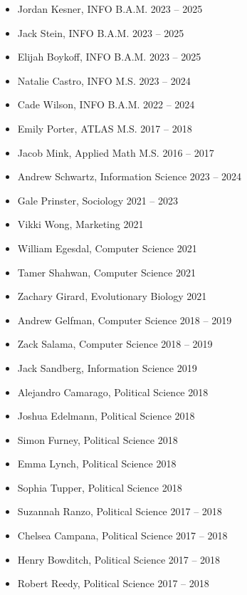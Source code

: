 \documentclass{cv}
\begin{document}
	\begin{itemize}
		\item Jordan Kesner, INFO B.A.M. \hfill 2023 -- 2025
		\item Jack Stein, INFO B.A.M. \hfill 2023 -- 2025
		\item Elijah Boykoff, INFO B.A.M. \hfill 2023 -- 2025
		\item Natalie Castro, INFO M.S. \hfill 2023 -- 2024
		\item Cade Wilson, INFO B.A.M. \hfill 2022 -- 2024
		\item Emily Porter, ATLAS M.S. \hfill 2017 -- 2018
		\item Jacob Mink, Applied Math M.S. \hfill 2016 -- 2017
	\end{itemize}

	\begin{itemize}
		\item Andrew Schwartz, Information Science \hfill 2023 -- 2024
		\item Gale Prinster, Sociology \hfill 2021 -- 2023
		\item Vikki Wong, Marketing \hfill 2021
		\item William Egesdal, Computer Science \hfill 2021
		\item Tamer Shahwan, Computer Science \hfill 2021
		\item Zachary Girard, Evolutionary Biology \hfill 2021
		\item Andrew Gelfman, Computer Science \hfill 2018 -- 2019
		\item Zack Salama, Computer Science \hfill 2018 -- 2019
		\item Jack Sandberg, Information Science \hfill 2019
		\item Alejandro Camarago, Political Science \hfill 2018
		\item Joshua Edelmann, Political Science \hfill 2018
		\item Simon Furney, Political Science \hfill 2018
		\item Emma Lynch, Political Science \hfill 2018
		\item Sophia Tupper, Political Science \hfill 2018
		\item Suzannah Ranzo, Political Science \hfill 2017 -- 2018
		\item Chelsea Campana, Political Science \hfill 2017 -- 2018
		\item Henry Bowditch, Political Science \hfill 2017 -- 2018
		\item Robert Reedy, Political Science \hfill 2017 -- 2018
	\end{itemize}
\end{document}
